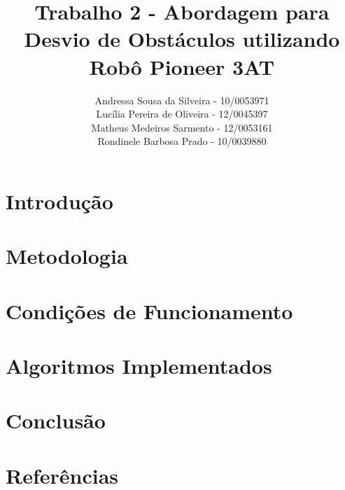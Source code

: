\documentclass[11pt,a4paper]{article}
\title{
Trabalho 2 - Abordagem para Desvio de Obstáculos utilizando Robô Pioneer 3AT
}
\author{
Andressa Sousa da Silveira - 10/0053971 \\
Lucília Pereira de Oliveira - 12/0045397 \\
Matheus Medeiros Sarmento - 12/0053161 \\
Rondinele Barbosa Prado - 10/0039880 \\
%
}
\begin{document}
\maketitle
\lstset{language=C++} 


\thispagestyle{empty}
\pagestyle{empty}

\section{Introdução}


\section{Metodologia}


\section{Condições de Funcionamento}


\section{Algoritmos Implementados}



\section{Conclusão}


\section{Referências}

\end{document}
